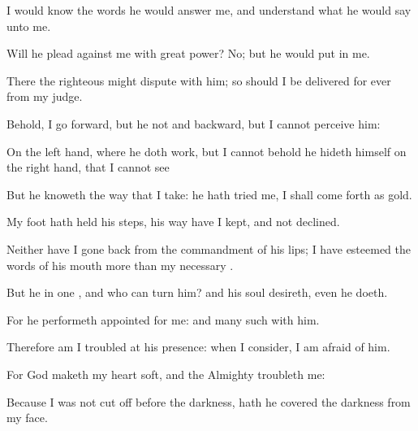 {I would
know the
words
{} he would
answer me, and
understand what he would
say unto me.

Will he
plead
against me with
{}
great
power? No; but he would
put
{} in me.

There the
righteous might
dispute with him; so should I be
delivered for
ever from my
judge.


\par }{\PP {}Behold, I
go
forward, but he
{} not
{} and
backward, but I cannot
perceive him:

On the left
hand, where he doth
work, but I cannot
behold
{} he
hideth himself on the right
hand, that I cannot
see
{}

But he
knoweth the
way that I
take:
{} he hath
tried me, I shall come
forth as
gold.

My
foot hath
held his
steps, his
way have I
kept, and not
declined.

Neither have I gone
back from the
commandment of his
lips; I have
esteemed the
words of his
mouth more than my
necessary
{}.


\par }{\PP {}But he
{} in
one
{}, and who can
turn him? and
{} his
soul
desireth, even
{} he
doeth.

For he
performeth
{}
appointed for me: and
many
such
{} with him.

Therefore am I
troubled at his
presence: when I
consider, I am
afraid of him.

For
God maketh my
heart
soft, and the
Almighty
troubleth me:

Because I was not cut
off
before the
darkness,
{} hath he
covered the
darkness from my
face.




\par }
